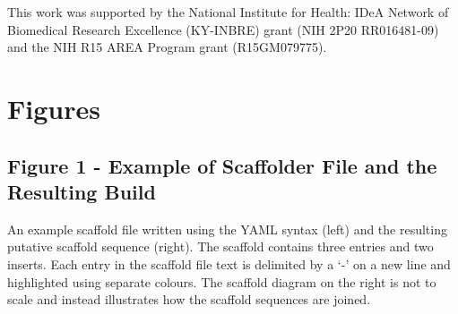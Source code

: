\documentclass[10pt]{bmc_article}
\newenvironment{bmcformat}{\begin{raggedright}\baselineskip20pt\sloppy\setboolean{publ}{false}}{\end{raggedright}\baselineskip20pt\sloppy}
\begin{document}
\begin{bmcformat}
This work was supported by the National Institute for Health: IDeA Network of
Biomedical Research Excellence (KY-INBRE) grant (NIH 2P20 RR016481-09) and the
NIH R15 AREA Program grant (R15GM079775).

\clearpage

{
   }     %


\clearpage

\section*{Figures} %

\subsection*{Figure 1 - Example of Scaffolder File and the Resulting Build}

An example scaffold file written using the YAML syntax \cite{yaml} (left) and
the resulting putative scaffold sequence (right). The scaffold contains three
entries and two inserts. Each entry in the scaffold file text is delimited by a
`-' on a new line and highlighted using separate colours. The scaffold diagram
on the right is not to scale and instead illustrates how the scaffold sequences
are joined. \pb

\end{bmcformat}
\end{document}
